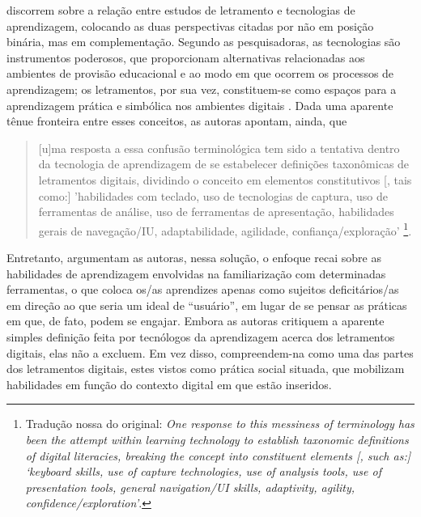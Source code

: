 \documentclass[portuguese]{textolivre}
\begin{document}
\textcite{gourlay_textual_2014} discorrem sobre a relação entre estudos de letramento e tecnologias de aprendizagem, colocando as duas perspectivas citadas por \textcite{lankshear_digital_2008} não em posição binária, mas em complementação. Segundo as pesquisadoras, as tecnologias são instrumentos poderosos, que proporcionam alternativas relacionadas aos ambientes de provisão educacional e ao modo em que ocorrem os processos de aprendizagem; os letramentos, por sua vez, constituem-se como espaços para a aprendizagem prática e simbólica nos ambientes digitais \cite[p.~2]{gourlay_textual_2014}. Dada uma aparente tênue fronteira entre esses conceitos, as autoras apontam, ainda, que

\begin{quote}
[u]ma resposta a essa confusão terminológica tem sido a tentativa dentro da tecnologia de aprendizagem de se estabelecer definições taxonômicas de letramentos digitais, dividindo o conceito em elementos constitutivos [, tais como:] 'habilidades com teclado, uso de tecnologias de captura, uso de ferramentas de análise, uso de ferramentas de apresentação, habilidades gerais de navegação/IU, adaptabilidade, agilidade, confiança/exploração' \cite[p.~8]{gourlay_textual_2014}\footnote{Tradução nossa do original: \textit{One response to this messiness of terminology has been the attempt within learning technology to establish taxonomic definitions of digital literacies, breaking the concept into constituent elements [, such as:] ‘keyboard skills, use of capture technologies, use of analysis tools, use of presentation tools, general navigation/UI skills, adaptivity, agility, confidence/exploration’}.}.  
\end{quote}

Entretanto, argumentam as autoras, nessa solução, o enfoque recai sobre as habilidades de aprendizagem envolvidas na familiarização com determinadas ferramentas, o que coloca os/as aprendizes apenas como sujeitos deficitários/as em direção ao que seria um ideal de “usuário”, em lugar de se pensar as práticas em que, de fato, podem se engajar. Embora as autoras critiquem a aparente simples definição feita por tecnólogos da aprendizagem acerca dos letramentos digitais, elas não a excluem. Em vez disso, compreendem-na como uma das partes dos letramentos digitais, estes vistos como prática social situada, que mobilizam habilidades em função do contexto digital em que estão inseridos.
\end{document}
